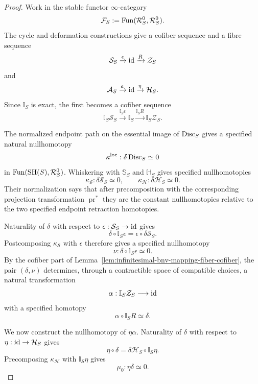 \begin{proof}
Work in the stable functor $\infty$-category
\[
    \mathcal F_S
    :=
    \operatorname{Fun}(\mathcal R_S^0,\mathcal R_S^0).
\]
The cycle and deformation constructions give a cofiber sequence and a fibre
sequence
\[
    \mathcal S_S
    \xrightarrow{\epsilon}
    \operatorname{id}
    \xrightarrow{R}
    \mathcal Z_S
\]
and
\[
    \mathcal A_S
    \xrightarrow{a}
    \operatorname{id}
    \xrightarrow{\eta}
    \mathcal H_S.
\]
Since $\mathbb I_S$ is exact, the first becomes a cofiber sequence
\[
    \mathbb I_S\mathcal S_S
    \xrightarrow{\mathbb I_S\epsilon}
    \mathbb I_S
    \xrightarrow{\mathbb I_SR}
    \mathbb I_S\mathcal Z_S.
\]

The normalized endpoint path on the essential image of $\operatorname{Disc}_S$ gives a
specified natural nullhomotopy
\[
    \kappa^{\mathrm{loc}}:
    \delta\operatorname{Disc}_S\simeq0
\]
in $\operatorname{Fun}(\mathrm{SH}(S),\mathcal R_S^0)$.  Whiskering with $\mathbb S_S$ and
$\mathbb H_S$ gives specified nullhomotopies
\[
    \kappa_{\mathcal S}:
    \delta\mathcal S_S\simeq0,
    \qquad
    \kappa_{\mathcal H}:
    \delta\mathcal H_S\simeq0.
\]
Their normalization says that after precomposition with the corresponding
projection transformation $\operatorname{pr}^*$ they are the constant
nullhomotopies relative to the two specified endpoint retraction homotopies.

Naturality of $\delta$ with respect to
$\epsilon:\mathcal S_S\to\operatorname{id}$ gives
\[
    \delta\circ\mathbb I_S\epsilon
    =
    \epsilon\circ\delta\mathcal S_S.
\]
Postcomposing $\kappa_{\mathcal S}$ with $\epsilon$ therefore gives a
specified nullhomotopy
\[
    \nu:
    \delta\circ\mathbb I_S\epsilon
    \simeq0.
\]
By the cofiber part of
Lemma~\ref{lem:infinitesimal-bnv-mapping-fiber-cofiber}, the pair
$(\delta,\nu)$ determines, through a contractible space of compatible
choices, a natural transformation
\[
    \alpha:
    \mathbb I_S\mathcal Z_S
    \longrightarrow
    \operatorname{id}
\]
with a specified homotopy
\[
    \alpha\circ\mathbb I_SR
    \simeq
    \delta.
\]

We now construct the nullhomotopy of $\eta\alpha$.  Naturality of $\delta$
with respect to $\eta:\operatorname{id}\to\mathcal H_S$ gives
\[
    \eta\circ\delta
    =
    \delta\mathcal H_S\circ\mathbb I_S\eta.
\]
Precomposing $\kappa_{\mathcal H}$ with $\mathbb I_S\eta$ gives
\[
    \mu_0:
    \eta\delta\simeq0.
\]


\end{proof}
